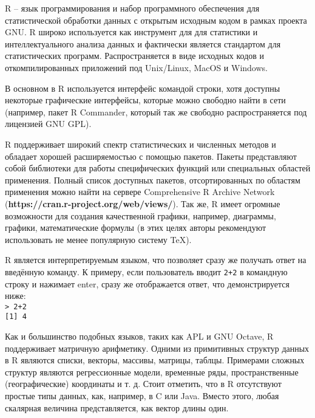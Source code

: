 
    R – язык программирования и набор программного обеспечения для статистической обработки 
    данных с открытым исходным кодом в рамках проекта GNU. R широко используется как 
    инструмент для для статистики и интеллектуального анализа данных и фактически является стандартом
    для статистических программ. Распространяется в виде исходных кодов и откомпилированных
    приложений под Unix/Linux, MacOS и Windows. 
    
    \indent В основном в R используется интерфейс командой строки, хотя доступны некоторые графические
    интерфейсы, которые можно свободно найти в сети (например, пакет R Commander, который так
    же свободно распространяется под лицензией GNU GPL).  
    
    \indent R поддерживает широкий спектр статистических и численных методов и обладает хорошей расширяемостью 
    с помощью пакетов. Пакеты представляют собой библиотеки для работы специфических функций или 
    специальных областей применения. Полный список доступных пакетов, отсортированных по областям 
    применения можно найти на сервере Comprehensive R Archive Network (\textbf{https://cran.r-project.org/web/views/}). Так же, R имеет огромные 
    возможности для создания качественной графики, например, диаграммы, графики, математические формулы 
    (в этих целях авторы рекомендуют использовать не менее популярную систему TeX). 
    
    \indent R является интерпретируемым языком, что позволяет сразу же получать ответ на введённую
    команду. К примеру, если пользователь вводит \texttt{2+2} в командную строку и нажимает enter, сразу же
    отображается ответ, что демонстрируется ниже: \\
    \indent \texttt{> 2+2} \\ 
    \indent \texttt{[1] 4} 
    
    \indent Как и большинство подобных языков, таких как APL и GNU Octave, R поддерживает матричную арифметику.
    Одними из примитивных структур данных в R являются списки, векторы, массивы, матрицы, таблцы.
    Примерами сложных структур являются регрессионные модели, временные ряды, пространственные 
    (географические) координаты и т. д. Стоит отметить, что в R отсутствуют простые типы данных, как,
    например, в C или Java. Вместо этого, любая скалярная величина представляется, как вектор длины один.  
    
